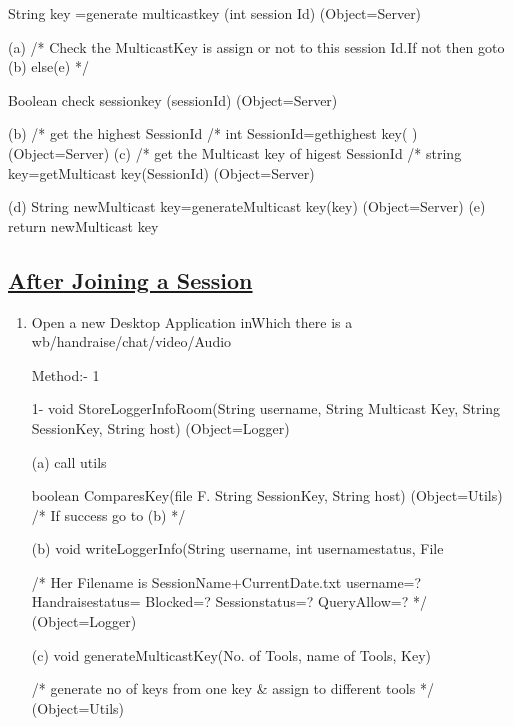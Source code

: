 \documentclass{article}
\begin{document}
\begin{enumerate}
\begin{enumerate}
\begin{enumerate}
 String key =generate multicastkey (int session Id)             (Object=Server) 

(a)  /* Check the MulticastKey is assign or not to this session Id.If not then goto (b) else(e) */ 

Boolean check sessionkey (sessionId)     (Object=Server) 
 
(b)  /* get the highest SessionId /* 
       int SessionId=gethighest key( )                          (Object=Server)						 
   (c)  /* get the Multicast key of higest SessionId  /*	 
  string key=getMulticast key(SessionId)                             (Object=Server) 
 
(d) String newMulticast key=generateMulticast key(key)                              (Object=Server) 
(e)     return newMulticast key 
\begin{center}

\label{figure:brihSync_Joining_Session.latex}
\end{center}
\end{enumerate}
\subsection*{\underline{After Joining a Session}}
\begin{enumerate}
\item[{}{}]
Open a new Desktop Application inWhich there is a wb/handraise/chat/video/Audio 

Method:- 1 

1- void StoreLoggerInfoRoom(String username, String Multicast Key,                      
String SessionKey, String host)             (Object=Logger)	 
 
 (a) call utils 

               boolean ComparesKey(file F. String SessionKey, String host)                                                                             
                                                        (Object=Utils) 
 /* If success go to (b)  */ 

(b) void writeLoggerInfo(String username, int usernamestatus, File 

/* Her Filename is SessionName+CurrentDate.txt  username=?   Handraisestatus= Blocked=?      Sessionstatus=?   QueryAllow=?  */              (Object=Logger) 
 
 (c)    void generateMulticastKey(No. of Tools, name of Tools, Key) 
  
           /*  generate no of keys from one key \&  assign to different tools  */      (Object=Utils) 
\begin{center}

\label{figure:brihSync_Afterjoining.latex}
\end{center}
\end{enumerate}


\end{enumerate}
\end{enumerate}
\end{document}
